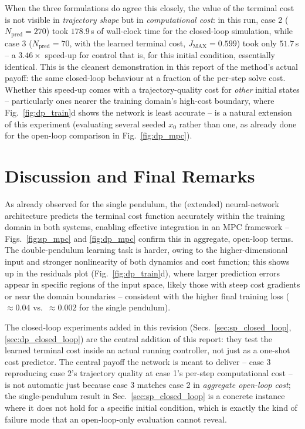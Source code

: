 \documentclass[11pt,a4paper]{article}
\begin{document}
When the three formulations do agree this closely, the value of the terminal cost is not
visible in \emph{trajectory shape} but in \emph{computational cost}: in this run, case 2
($N_{\text{pred}}=270$) took $178.9\,$s of wall-clock time for the closed-loop simulation, while
case 3 ($N_{\text{pred}}=70$, with the learned terminal cost, $J_{\text{MAX}}=0.599$) took only
$51.7\,$s -- a $3.46\times$ speed-up for control that is, for this initial condition, essentially
identical. This is the cleanest demonstration in this report of the method's actual payoff:
the same closed-loop behaviour at a fraction of the per-step solve cost. Whether this speed-up
comes with a trajectory-quality cost for \emph{other} initial states -- particularly ones nearer
the training domain's high-cost boundary, where Fig.~\ref{fig:dp_train}d shows the network is
least accurate -- is a natural extension of this experiment (evaluating several seeded $x_0$
rather than one, as already done for the open-loop comparison in Fig.~\ref{fig:dp_mpc}).

\section{Discussion and Final Remarks}

As already observed for the single pendulum, the (extended) neural-network architecture predicts
the terminal cost function accurately within the training domain in both systems, enabling
effective integration in an MPC framework -- Figs.~\ref{fig:sp_mpc} and \ref{fig:dp_mpc} confirm
this in aggregate, open-loop terms. The double-pendulum learning task is harder, owing to the
higher-dimensional input and stronger nonlinearity of both dynamics and cost function; this shows
up in the residuals plot (Fig.~\ref{fig:dp_train}d), where larger prediction errors appear in
specific regions of the input space, likely those with steep cost gradients or near the domain
boundaries -- consistent with the higher final training loss ($\approx 0.04$ vs.\ $\approx 0.002$
for the single pendulum).

The closed-loop experiments added in this revision (Secs.~\ref{sec:sp_closed_loop},
\ref{sec:dp_closed_loop}) are the central addition of this report: they test the learned
terminal cost inside an actual running controller, not just as a one-shot cost predictor. The
central payoff the network is meant to deliver -- case 3 reproducing case 2's trajectory quality
at case 1's per-step computational cost -- is not automatic just because case 3 matches case 2 in
\emph{aggregate open-loop cost}; the single-pendulum result in Sec.~\ref{sec:sp_closed_loop} is a
concrete instance where it does not hold for a specific initial condition, which is exactly the
kind of failure mode that an open-loop-only evaluation cannot reveal.
\end{document}
